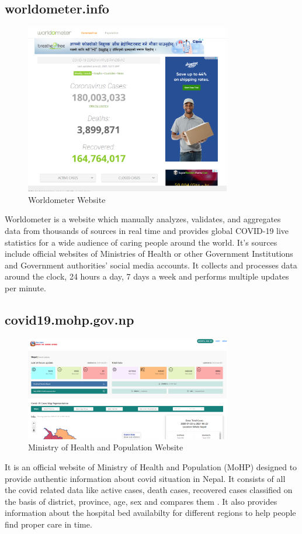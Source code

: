 \documentclass[12pt]{article}
\begin{document}
\subsection{worldometer.info}
\begin{figure}[h]
    \centerline{\includegraphics[width = 90mm]{worldometer.png}}
    \caption{Worldometer Website}
    \label{fig}
\end{figure}
Worldometer is a website which manually analyzes, validates, and aggregates data from thousands of sources in real time and provides global COVID-19 live statistics for a wide audience of caring people around the world. It's sources include official websites of Ministries of Health or other Government Institutions and Government authorities' social media accounts. It collects and processes data around the clock, 24 hours a day, 7 days a week and performs multiple updates per minute. 
\vspace{10mm}
\clearpage
\subsection{covid19.mohp.gov.np}
\begin{figure}[h]
    \centerline{\includegraphics[width = 90mm]{mohp.png}}
    \caption{Ministry of Health and Population Website}
    \label{fig}
\end{figure}
It is an official website of Ministry of Health and Population (MoHP) designed to provide authentic information about covid situation in Nepal. It consists of all the covid related data like active cases, death cases, recovered cases classified on the basis of district, province, age, sex and compares them . It also provides information about the hospital bed availabilty for different regions to help people find proper care in time. 
\end{document}
